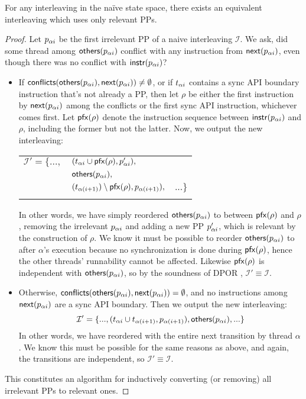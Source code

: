 \begin{lemma}
	For any interleaving in the na\"{i}ve state space, there exists an equivalent interleaving which uses only relevant PPs.
	\label{lem:equivalent}
\end{lemma}

\begin{proof}
	Let $p_{\alpha{}i}$ be the first irrelevant PP of a naive interleaving $\mathcal{I}$.
	We ask, did some thread among $\mathsf{others}(p_{\alpha{}i})$ conflict with any instruction from $\mathsf{next}(p_{\alpha{}i})$, even though there was no conflict with $\mathsf{instr}(p_{\alpha{}i})$?
	\begin{itemize}
		\item If $\mathsf{conflicts}(\mathsf{others}(p_{\alpha{}i}),\mathsf{next}(p_{\alpha{}i})) \ne \emptyset$, or if $t_{\alpha{}i}$ contains a sync API boundary instruction that's not already a PP,
			then let $\rho$ be either the first instruction by $\mathsf{next}(p_{\alpha{}i})$ among the conflicts or the first sync API instruction, whichever comes first.
			Let $\mathsf{pfx}(\rho)$ denote the instruction sequence between $\mathsf{instr}(p_{\alpha{}i})$ and $\rho$, including the former but not the latter.
			Now, we output the new interleaving:

			\begin{tabular}{lll}
				\\
				$\mathcal{I}' = \{...,$&$(t_{\alpha{}i} \cup \mathsf{pfx}(\rho), p_{\alpha{}i}'),$& \\
									   &$\mathsf{others}(p_{\alpha{}i}),$& \\
					       &$(t_{\alpha{}(i+1)}) \setminus \mathsf{pfx}(\rho), p_{\alpha{}(i+1)}),$ & $ ...\}$ \\
				\\
			\end{tabular}

			In other words, we have simply reordered $\mathsf{others}(p_{\alpha{}i})$ to between $\mathsf{pfx}(\rho)$ and $\rho$, removing the irrelevant $p_{\alpha{}i}$ and adding a new PP $p_{\alpha{}i}'$, which is relevant by the construction of $\rho$.
			We know it must be possible to reorder $\mathsf{others}(p_{\alpha{}i})$ to after $\alpha$'s execution because no synchronization is done during $\mathsf{pfx}(\rho)$, hence the other threads' runnability cannot be affected.
			Likewise $\mathsf{pfx}(\rho)$ is independent with $\mathsf{others}(p_{\alpha{}i})$, so by the soundness of DPOR \cite{dpor}, $\mathcal{I}' \equiv \mathcal{I}$.
		\item Otherwise, $\mathsf{conflicts}(\mathsf{others}(p_{\alpha{}i}),\mathsf{next}(p_{\alpha{}i})) = \emptyset$, and no instructions among $\mathsf{next}(p_{\alpha{}i})$ are a sync API boundary.
			Then we output the new interleaving:
			\[
				\mathcal{I}' = \{..., (t_{\alpha{}i} \cup t_{\alpha(i+1)}, p_{\alpha(i+1)}), \mathsf{others}(p_{\alpha{}i}),...\}
			\]
			In other words, we have reordered {\ppothers{\pai}} with the entire next transition by thread $\alpha$.
			We know this must be possible for the same reasons as above, and again, the transitions are independent, so $\mathcal{I}' \equiv \mathcal{I}$.
	\end{itemize}
	This constitutes an algorithm for inductively converting (or removing) all irrelevant PPs to relevant ones.
\end{proof}

